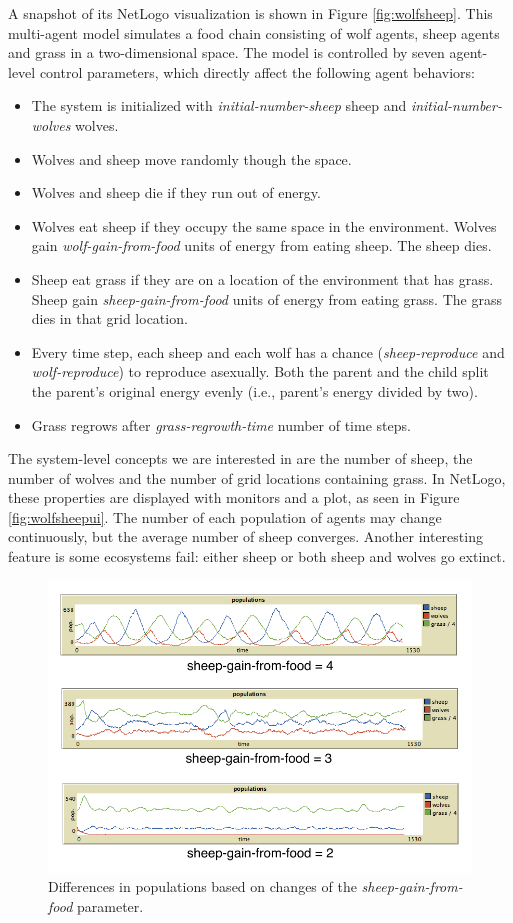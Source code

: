 A snapshot of its NetLogo visualization is shown in Figure \ref{fig:wolfsheep}.
This multi-agent model simulates a food chain consisting of wolf agents, sheep agents and grass in a two-dimensional space.
The model is controlled by seven agent-level control parameters, which directly affect the following agent behaviors:
\begin{itemize}
  \item The system is initialized with \textit{initial-number-sheep} sheep and \textit{initial-number-wolves} wolves.
  \item Wolves and sheep move randomly though the space.
  \item Wolves and sheep die if they run out of energy.
  \item Wolves eat sheep if they occupy the same space in the environment. Wolves gain \textit{wolf-gain-from-food} units of energy from eating sheep. The sheep dies.
  \item Sheep eat grass if they are on a location of the environment that has grass. Sheep gain \textit{sheep-gain-from-food} units of energy from eating grass. The grass dies in that grid location.
  \item Every time step, each sheep and each wolf has a chance (\textit{sheep-reproduce} and \textit{wolf-reproduce}) to reproduce asexually. Both the parent and the child split the parent's original energy evenly (i.e., parent's energy divided by two).
  \item Grass regrows after \textit{grass-regrowth-time} number of time steps.
\end{itemize}

The system-level concepts we are interested in are the number of sheep, the number of wolves and the number of grid locations containing grass.
In NetLogo, these properties are displayed with monitors and a plot, as seen in Figure \ref{fig:wolfsheepui}.
The number of each population of agents may change continuously, but the average number of sheep converges.
Another interesting feature is some ecosystems fail: either sheep or both sheep and wolves go extinct.

\begin{figure}[ht]
\centering
\includegraphics[scale=1]{images/different_sheep.pdf}
\caption{Differences in populations based on changes of the \textit{sheep-gain-from-food} parameter.}
\label{fig:diffsheep}
\end{figure}

